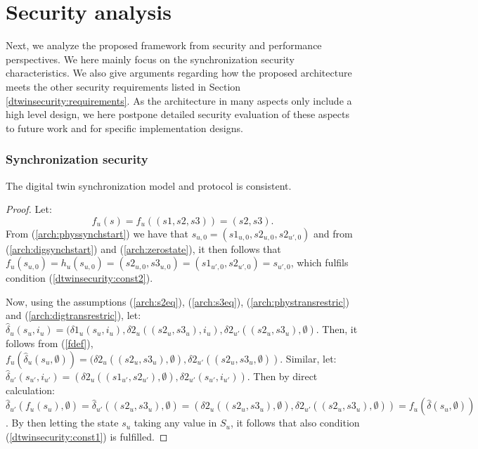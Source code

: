 \section{Security analysis}
\label{analysis}
Next, we analyze the proposed framework from security and performance perspectives. We here mainly focus on the synchronization security characteristics. We also give arguments regarding how the proposed architecture meets the other security requirements listed in Section \ref{dtwinsecurity:requirements}. As the architecture in many aspects only include a high level design, we here postpone detailed security evaluation of these aspects to future work and for specific implementation designs. 
\subsubsection{Synchronization security}
\begin{prop}
\label{analysis:synchsec}
The digital twin synchronization model and protocol is consistent.
\end{prop}
\begin{proof}
Let:
\begin{equation}
f_u(s) = f_u((s1,s2,s3)) = (s2,s3). \label{fdef}
\end{equation}
From (\ref{arch:physsynchstart}) we have that $s_{u,0} = (s1_{u,0},s2_{u,0},s2_{u',0})$ and from (\ref{arch:digsynchstart}) and (\ref{arch:zerostate}), it then follows that $f_u(s_{u,0}) = h_u(s_{u,0}) =  (s2_{u,0},s3_{u,0}) = (s1_{u',0},s2_{u',0}) = s_{u',0}$, which fulfils condition (\ref{dtwinsecurity:const2}).

Now, using the assumptions (\ref{arch:s2eq}),  (\ref{arch:s3eq}), (\ref{arch:phystransrestric}) and (\ref{arch:digtransrestric}), let: $\hat{\delta}_u(s_u,i_u) = (\delta1_u(s_u,i_u), \delta2_u((s2_u,s3_u),i_u), \delta2_{u'}((s2_u,s3_u),\emptyset)$. Then, it follows from (\ref{fdef}), $f_u(\hat{\delta}_u(s_u,\emptyset)) = (\delta2_u((s2_u,s3_u),\emptyset), \delta2_{u'}((s2_u,s3_u,\emptyset))$. Similar, let: $\hat{\delta}_{u'}(s_{u'},i_{u'}) = (\delta2_u((s1_{u'},s2_{u'}),\emptyset),\delta2_{u'}(s_{u'},i_{u'}))$. Then by direct calculation: $\hat{\delta}_{u'}(f_u(s_u),\emptyset) = \hat{\delta}_{u'}((s2_u,s3_u),\emptyset) = (\delta2_u((s2_u,s3_u),\emptyset),\delta2_{u'}((s2_u,s3_u),\emptyset)) = f_u(\hat{\delta}(s_u,\emptyset))$.
 By then letting the state $s_u$ taking any value in $S_u$, it follows that also condition (\ref{dtwinsecurity:const1}) is fulfilled.
\end{proof}

